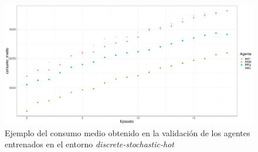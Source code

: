 \begin{table}
    \centering
    \caption{Consumo medio de los agentes entrenados en entornos continuos a lo largo de 20 episodios de validación}
    \label{tb:consumo-cont}
\end{table}

\begin{figure}
    \centering
    \includegraphics[width=\textwidth]{imagenes/consumo-disc-hot.pdf}
    \caption{Ejemplo del consumo medio obtenido en la validación de los agentes entrenados en el entorno \textit{discrete-stochastic-hot}}
    \label{fig:consumo-disc-hot}
\end{figure}

